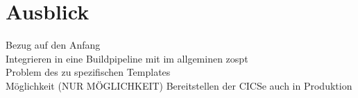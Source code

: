 \chapter{Ausblick}\label{ch:ausblick}

Bezug auf den Anfang\\
Integrieren in eine Buildpipeline mit im allgeminen zospt\\
Problem des zu spezifischen Templates\\
Möglichkeit (NUR MÖGLICHKEIT) Bereitstellen der CICSe auch in Produktion

